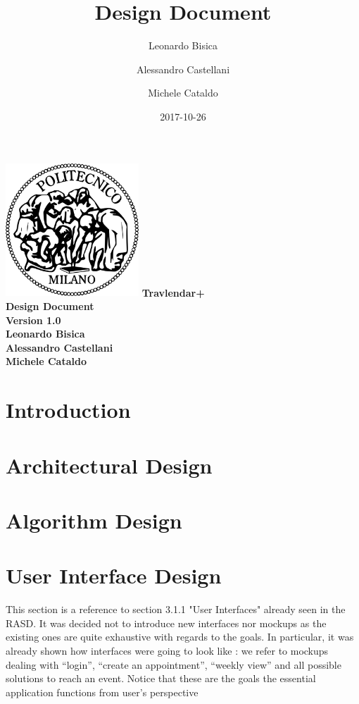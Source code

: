 \documentclass[12pt, a4paper]{article}
\title{Design Document}
\date{2017-10-26}
\author{
	Leonardo Bisica
	\and
	Alessandro Castellani
	\and
	Michele Cataldo
}
\begin{document}
	\begin{titlepage}
		\centering
		\includegraphics[width=5cm]{img/polimi_logo}
		\vfill
		{\bfseries\Large
			Travlendar+\\
			Design Document\\
			Version 1.0\\
			\vskip4cm
			Leonardo Bisica\\
			Alessandro Castellani\\
			Michele Cataldo\\
		}
		\vfill
		\vfill
	\end{titlepage}

	\tableofcontents
	
	
	
	\newpage
	\section{Introduction}
		
		

	\newpage
	\section{Architectural Design}
		
		
	\newpage
	\section{Algorithm Design}
		

	\newpage
	\section{User Interface Design}
		This section is a reference to section 3.1.1 "User Interfaces" already seen in the RASD.
It was decided not to introduce new interfaces nor mockups as the existing ones are quite exhaustive with regards to the goals. In particular, it was already shown how interfaces were going to look like : we refer to mockups dealing with  “login”, “create an appointment”, “weekly view” and all possible solutions to reach an event. 
Notice that these are the goals the essential application functions from user's perspective
		
\end{document}
